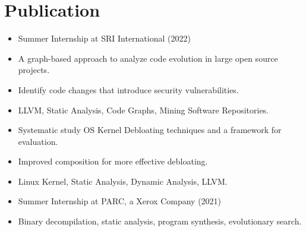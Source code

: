 \section{Publication}
{
    \begin{itemize}
        \item Summer Internship at SRI International (2022)
        \item A graph-based approach to analyze code evolution in large open source projects.
        \item Identify code changes that introduce security vulnerabilities.
        \item LLVM, Static Analysis, Code Graphs, Mining Software Repositories.
    \end{itemize}
}

{
    \begin{itemize}
        \item Systematic study OS Kernel Debloating techniques and a framework for evaluation.
        \item Improved composition for more effective debloating.
        \item Linux Kernel, Static Analysis, Dynamic Analysis, LLVM.
    \end{itemize}
}

{
    \begin{itemize}
        \item Summer Internship at PARC, a Xerox Company (2021)
        \item Binary decompilation, static analysis, program synthesis, evolutionary search.
    \end{itemize}
}


